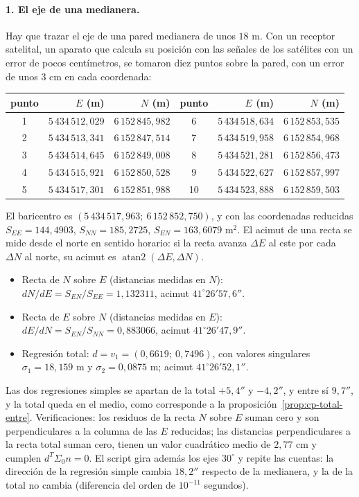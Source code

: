 \paragraph{1. El eje de una medianera.} Hay que trazar el eje de una pared medianera de unos
\(18\) m. Con un receptor satelital, un aparato que calcula su posición con las señales de los
satélites con un error de pocos centímetros, se tomaron diez puntos sobre la pared, con un
error de unos \(3\) cm en cada coordenada:
\begin{center}
\small
\begin{tabular}{crr@{\qquad}crr}
\toprule
punto & \(E\) (m) & \(N\) (m) & punto & \(E\) (m) & \(N\) (m)\\
\midrule
1 & \(5\,434\,512{,}029\) & \(6\,152\,845{,}982\) & 6 & \(5\,434\,518{,}634\) & \(6\,152\,853{,}535\)\\
2 & \(5\,434\,513{,}341\) & \(6\,152\,847{,}514\) & 7 & \(5\,434\,519{,}958\) & \(6\,152\,854{,}968\)\\
3 & \(5\,434\,514{,}645\) & \(6\,152\,849{,}008\) & 8 & \(5\,434\,521{,}281\) & \(6\,152\,856{,}473\)\\
4 & \(5\,434\,515{,}921\) & \(6\,152\,850{,}528\) & 9 & \(5\,434\,522{,}627\) & \(6\,152\,857{,}997\)\\
5 & \(5\,434\,517{,}301\) & \(6\,152\,851{,}988\) & 10 & \(5\,434\,523{,}888\) & \(6\,152\,859{,}503\)\\
\bottomrule
\end{tabular}
\end{center}
El baricentro es \((5\,434\,517{,}963;\ 6\,152\,852{,}750)\), y con las coordenadas reducidas
\(S_{EE}=144{,}4903\), \(S_{NN}=185{,}2725\), \(S_{EN}=163{,}6079\) m\(^2\). El acimut de una
recta se mide desde el norte en sentido horario: si la recta avanza \(\Delta E\) al este por
cada \(\Delta N\) al norte, su acimut es \(\operatorname{atan2}(\Delta E,\Delta N)\).
\begin{itemize}
  \item Recta de \(N\) sobre \(E\) (distancias medidas en \(N\)): \(dN/dE=S_{EN}/S_{EE}=1{,}132311\),
  acimut \(41^\circ26'57{,}6''\).
  \item Recta de \(E\) sobre \(N\) (distancias medidas en \(E\)): \(dE/dN=S_{EN}/S_{NN}=0{,}883066\),
  acimut \(41^\circ26'47{,}9''\).
  \item Regresión total: \(d=v_1=(0{,}6619;\ 0{,}7496)\), con valores singulares
  \(\sigma_1=18{,}159\) m y \(\sigma_2=0{,}0875\) m; acimut \(41^\circ26'52{,}1''\).
\end{itemize}
Las dos regresiones simples se apartan de la total \(+5{,}4''\) y \(-4{,}2''\), y entre sí
\(9{,}7''\), y la total queda en el medio, como corresponde a la
proposición~\ref{prop:cp-total-entre}. Verificaciones: los residuos de la recta \(N\) sobre \(E\) suman cero y son
perpendiculares a la columna de las \(E\) reducidas; las distancias perpendiculares a la
recta total suman cero, tienen un valor cuadrático medio de \(2{,}77\) cm y cumplen
\(d^T\Sigma_0n=0\). El script gira además los ejes \(30^\circ\) y repite las cuentas: la dirección de
la regresión simple cambia \(18{,}2''\) respecto de la medianera, y la de la total no cambia
(diferencia del orden de \(10^{-11}\) segundos).


